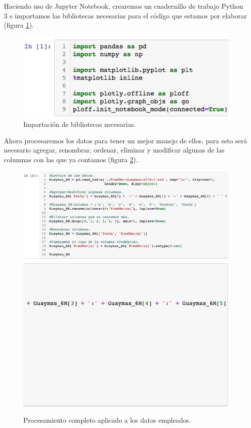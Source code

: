 \documentclass[12pt]{article}
\begin{document}
\noindent Haciendo uso de Jupyter Notebook, crearemos un cuadernillo de trabajo Python 3 e importamos las bibliotecas necesarias para el código que estamos por elaborar (figura \ref{fig:bibliotecas}).

\begin{figure}[h!]
	\center
	\includegraphics[scale=.6]{./Images/bibliotecas}
	\caption{\label{fig:bibliotecas} Importación de bibliotecas necesarias.}	
\end{figure}

\noindent Ahora procesaremos los datos para tener un mejor manejo de ellos, para esto será necesario agregar, renombrar, ordenar, eliminar y modificar algunas de las columnas con las que ya contamos (figura \ref{fig:process}).

\begin{figure}[h!]
	\center
	\includegraphics[scale=.6]{./Images/procesamientoA}
	\includegraphics[scale=.6]{./Images/procesamientoB}
	\caption{\label{fig:process} Procesamiento completo aplicado a los datos empleados.}
\end{figure}
\end{document}
